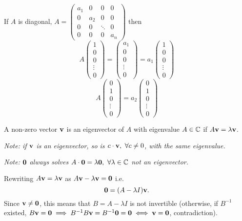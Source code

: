 \documentclass[10pt, a4paper]{article}
\begin{document}
If $A$ is diagonal,
$A = \begin{pmatrix}
    a_1 & 0 & 0 & 0 \\
    0 & a_2 & 0 & 0 \\
    0 & 0 & \ddots & 0 \\
    0 & 0 & 0 & a_n
\end{pmatrix}$
then
\[
A\begin{pmatrix}
    1 \\ 0 \\ 0 \\ \vdots \\ 0
\end{pmatrix} = \begin{pmatrix}
    a_1 \\ 0 \\ 0 \\ \vdots \\ 0
\end{pmatrix} = a_1\begin{pmatrix}
    1 \\ 0 \\ 0 \\ \vdots \\ 0
\end{pmatrix}
\]
\[
A\begin{pmatrix}
    0 \\ 1 \\ 0 \\ \vdots \\ 0
\end{pmatrix} = a_2\begin{pmatrix}
    0 \\ 1 \\ 0 \\ \vdots \\ 0
\end{pmatrix}
\]

\begin{definition}[Eigenvector]
    A non-zero vector $\mathbf{v}$ is an eigenvector of $A$ with eigenvalue $A \in \mathbb{C}$ if $A\mathbf{v} = \lambda\mathbf{v}$.
\end{definition}

\textit{Note:
if $\mathbf{v}$ is an eigenvector,
so is $c\cdot \mathbf{v},\ \forall c \neq 0$,
with the same eigenvalue.}

\textit{Note:
$\mathbf{0}$ always solves $A \cdot \mathbf{0} = \lambda\mathbf{0},\ \forall \lambda \in \mathbb{C}$ not an eigenvector.}

Rewriting $A\mathbf{v} = \lambda\mathbf{v}$ as $A\mathbf{v} - \lambda\mathbf{v} = \mathbf{0}$
i.e.
\[
\mathbf{0} = (A - \lambda I)\mathbf{v}.
\]
Since $\mathbf{v} \neq \mathbf{0}$,
this means that
$B = A - \lambda I$ is not invertible
(otherwise,
if $B ^ {-1}$ existed,
$B\mathbf{v} = \mathbf{0} \implies B ^ {-1}B\mathbf{v} = B ^ {-1}\mathbf{0} = \mathbf{0} \iff \mathbf{v} = \mathbf{0}$,
contradiction).
\end{document}
